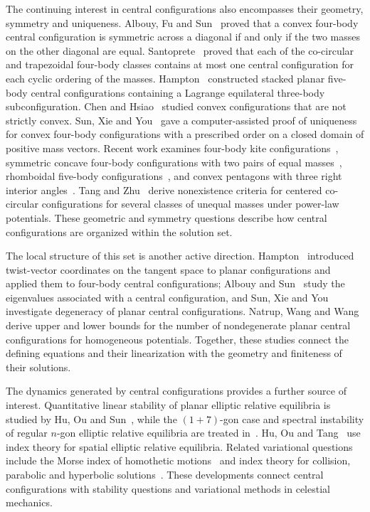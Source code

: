 \documentclass[Threeside,11pt]{article}
\theoremstyle{definition}
\theoremstyle{remark}
\numberwithin{equation}{section}
\theoremstyle{remark}
\begin{document}
The continuing interest in central configurations also encompasses their
geometry, symmetry and uniqueness. Albouy, Fu and Sun~\cite{AFS08} proved
that a convex four-body central configuration is symmetric across a diagonal
if and only if the two masses on the other diagonal are equal.
Santoprete~\cite{San21a,San21b} proved that each of the
co-circular and trapezoidal four-body classes contains at most one central
configuration for each cyclic ordering of the masses. Hampton~\cite{Ham05}
constructed stacked planar five-body central configurations containing a
Lagrange equilateral three-body subconfiguration. Chen and Hsiao~\cite{CH12}
studied convex configurations that are not strictly convex. Sun, Xie and
You~\cite{SXY23} gave a computer-assisted proof of uniqueness for convex
four-body configurations with a prescribed order on a closed domain of
positive mass vectors. Recent work examines four-body kite
configurations~\cite{RobK25}, symmetric concave four-body configurations
with two pairs of equal masses~\cite{LX26}, rhomboidal five-body
configurations~\cite{CCRh26}, and convex pentagons with three right interior
angles~\cite{FGMS26}. Tang and Zhu~\cite{TZ24} derive nonexistence criteria
for centered co-circular configurations for several classes of unequal
masses under power-law potentials. These geometric and symmetry questions
describe how central configurations are organized within the solution set.

The local structure of this set is another active direction. Hampton~\cite{Hamp24}
introduced twist-vector coordinates on the tangent space to planar
configurations and applied them to four-body central configurations;
Albouy and Sun~\cite{AS25} study the eigenvalues associated with a central
configuration, and
Sun, Xie and You~\cite{SXY25} investigate degeneracy of planar central
configurations. Natrup, Wang and Wang~\cite{NWW25} derive upper and lower
bounds for the number of nondegenerate planar central configurations for
homogeneous potentials.
Together, these studies connect the defining equations and their linearization
with the geometry and finiteness of their solutions.

The dynamics generated by central configurations provides a further source of
interest. Quantitative linear stability of planar elliptic relative equilibria
is studied by Hu, Ou and Sun~\cite{HOS25}, while the $(1+7)$-gon case and
spectral instability of regular $n$-gon elliptic relative equilibria are treated
in~\cite{OS23,OW25}. Hu, Ou and Tang~\cite{HOT23} use index theory for spatial
elliptic relative equilibria. Related variational questions include the Morse
index of homothetic motions~\cite{OP25} and index theory for collision,
parabolic and hyperbolic solutions~\cite{HOY21}. These developments connect
central configurations with stability questions and variational methods in
celestial mechanics.
\end{document}
